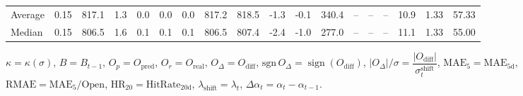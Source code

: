 \begin{threeparttable}
{\begin{tabular}{lrrrrrrrrrrrrrrrrr}
Average &     0.15 & 817.1 &               1.3 &               0.0 &                0.0 &                0.0 & 817.2 & 818.5 &       -1.3 &                     -0.1 &               340.4 &         -- &        -- &             -- &             10.9 &            1.33 &                  57.33 \\
 Median &     0.15 & 806.5 &               1.6 &               0.1 &                0.1 &                0.1 & 806.5 & 807.4 &       -2.4 &                     -1.0 &               277.0 &         -- &        -- &             -- &             11.1 &            1.33 &                  55.00 \\
\bottomrule
\end{tabular}
}
\begin{tablenotes}\footnotesize
\item $\kappa=\kappa(\sigma)$, $B=B_{t-1}$, $O_p=O_{\text{pred}}$, $O_r=O_{\text{real}}$, $O_\Delta=O_{\text{diff}}$, $\mathrm{sgn}\,O_\Delta=\operatorname{sign}(O_{\text{diff}})$, $|O_\Delta|/\sigma=\dfrac{|O_{\text{diff}}|}{\sigma_t^{\text{shift}}}$, $\mathrm{MAE}_5=\mathrm{MAE}_{5\text{d}}$, $\mathrm{RMAE}= \mathrm{MAE}_5 / \text{Open}$, $\mathrm{HR}_{20}=\mathrm{HitRate}_{20\text{d}}$, 
$\lambda_{\text{shift}}=\lambda_t$, 
$\Delta\alpha_t=\alpha_t-\alpha_{t-1}$.
\end{tablenotes}
\end{threeparttable}
\endgroup

